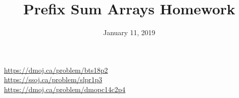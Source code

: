 \documentclass{problem-set}
\title{Prefix Sum Arrays Homework}
\date{January 11, 2019}
\begin{document}
\maketitle
{
  \parbox{\textwidth}{
    \url{https://dmoj.ca/problem/bts18p2} \\
    \url{https://ssoj.ca/problem/slpr1p3} \\
    \url{https://dmoj.ca/problem/dmopc14c2p4}
  }
}\\
\vspace{3em}\\
\parbox{\textwidth}{
}
\end{document}
